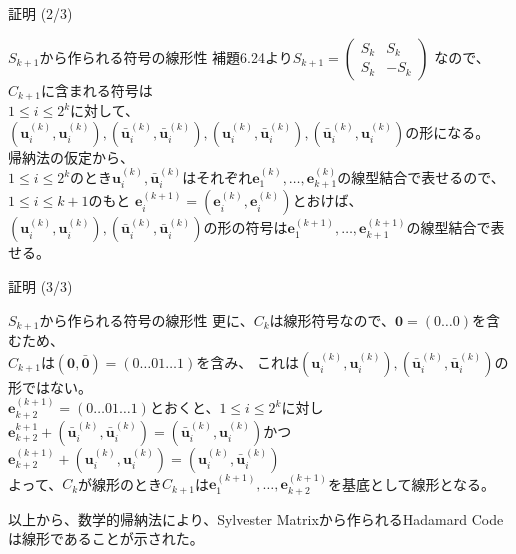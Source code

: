 \documentclass[dvipdfmx,10pt,jsarticle]{beamer}
\begin{document}
  \begin{frame}{証明 (2/3)}
    \begin{block}{$S_{k+1}$から作られる符号の線形性}
      補題6.24より$S_{k+1} = \begin{pmatrix}
        S_k & S_k \\ 
        S_k & - S_k
      \end{pmatrix}$
      なので、$C_{k+1}$に含まれる符号は\\
      $1 \leq i \leq 2^k$に対して、 $(\mathbf{u}^{(k)}_i , \mathbf{u}^{(k)}_i), (\bar{\mathbf{u}}^{(k)}_i, \bar{\mathbf{u}}^{(k)}_i), (\mathbf{u}^{(k)}_i, \bar{\mathbf{u}}^{(k)}_i), (\bar{\mathbf{u}}^{(k)}_i, \mathbf{u}^{(k)}_i)$の形になる。\\
      帰納法の仮定から、 \\
      $1 \leq i \leq 2^k$のとき$\mathbf{u}^{(k)}_i, \bar{\mathbf{u}}^{(k)}_i$はそれぞれ$\mathbf{e}^{(k)}_1, \ldots, \mathbf{e}^{(k)}_{k+1}$の線型結合で表せるので、\\
      $1 \leq i \leq k + 1$のもと $\mathbf{e}^{(k+1)}_i = ( \mathbf{e}^{(k)}_i, \mathbf{e}^{(k)}_i )$とおけば、\\
      $(\mathbf{u}^{(k)}_i , \mathbf{u}^{(k)}_i), (\bar{\mathbf{u}}^{(k)}_i, \bar{\mathbf{u}}^{(k)}_i)$の形の符号は$\mathbf{e}^{(k+1)}_1, \ldots, \mathbf{e}^{(k+1)}_{k+1}$の線型結合で表せる。\\
    \end{block}
  \end{frame}

  \begin{frame}{証明 (3/3)}
    \begin{block}{$S_{k+1}$から作られる符号の線形性}
      更に、$C_k$は線形符号なので、$\mathbf{0} = ( 0 \ldots 0 )$を含むため、\\
      $C_{k+1}$は$(\mathbf{0}, \bar{\mathbf{0}}) = (0\ldots01\ldots 1)$を含み、
      これは$(\mathbf{u}^{(k)}_i , \mathbf{u}^{(k)}_i), (\bar{\mathbf{u}}^{(k)}_i, \bar{\mathbf{u}}^{(k)}_i)$の形ではない。\\
      $\mathbf{e}^{(k+1)}_{k+2} = (0\ldots 01 \ldots 1)$とおくと、$1 \leq i \leq 2^k$に対し \\
      $\mathbf{e}^{k+1}_{k+2} + (\bar{\mathbf{u}}^{(k)}_i, \bar{\mathbf{u}}^{(k)}_i) = (\bar{\mathbf{u}}^{(k)}_i, \mathbf{u}^{(k)}_i)$かつ$\mathbf{e}^{(k+1)}_{k+2} + (\mathbf{u}^{(k)}_i, \mathbf{u}^{(k)}_i) = (\mathbf{u}^{(k)}_i, \bar{\mathbf{u}}^{(k)}_i)$\\
      よって、$C_k$が線形のとき$C_{k+1}$は$\mathbf{e}^{(k+1)}_1 , \ldots, \mathbf{e}^{(k+1)}_{k+2}$を基底として線形となる。
    \end{block}
    
    以上から、数学的帰納法により、Sylvester Matrixから作られるHadamard Codeは線形であることが示された。
  \end{frame}
\end{document}
